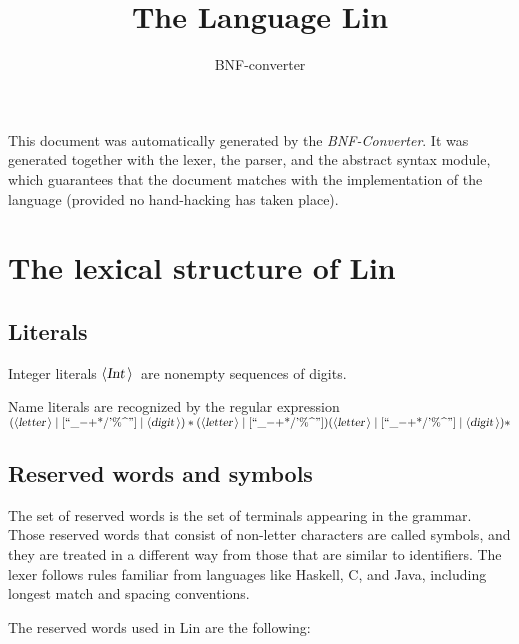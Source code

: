 \documentclass[a4paper,11pt]{article}
\author{BNF-converter}
\title{The Language Lin}
\begin{document}
\maketitle

\newcommand{\emptyP}{\mbox{$\epsilon$}}
\newcommand{\terminal}[1]{\mbox{{\texttt {#1}}}}
\newcommand{\nonterminal}[1]{\mbox{$\langle \mbox{{\sl #1 }} \! \rangle$}}
\newcommand{\arrow}{\mbox{::=}}
\newcommand{\delimit}{\mbox{$|$}}
\newcommand{\reserved}[1]{\mbox{{\texttt {#1}}}}
\newcommand{\literal}[1]{\mbox{{\texttt {#1}}}}
\newcommand{\symb}[1]{\mbox{{\texttt {#1}}}}

This document was automatically generated by the {\em BNF-Converter}. It was generated together with the lexer, the parser, and the abstract syntax module, which guarantees that the document matches with the implementation of the language (provided no hand-hacking has taken place).

\section*{The lexical structure of Lin}

\subsection*{Literals}
Integer literals \nonterminal{Int}\ are nonempty sequences of digits.




Name literals are recognized by the regular expression
\(({\nonterminal{letter}} \mid [\mbox{``\_{$-$}{$+$}*/'\%{\textasciicircum}''}] \mid {\nonterminal{digit}})* ({\nonterminal{letter}} \mid [\mbox{``\_{$-$}{$+$}*/'\%{\textasciicircum}''}]) ({\nonterminal{letter}} \mid [\mbox{``\_{$-$}{$+$}*/'\%{\textasciicircum}''}] \mid {\nonterminal{digit}})*\)


\subsection*{Reserved words and symbols}
The set of reserved words is the set of terminals appearing in the grammar. Those reserved words that consist of non-letter characters are called symbols, and they are treated in a different way from those that are similar to identifiers. The lexer follows rules familiar from languages like Haskell, C, and Java, including longest match and spacing conventions.

The reserved words used in Lin are the following: \\
\end{document}
